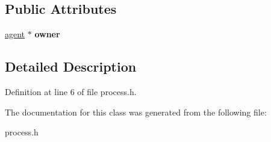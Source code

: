 \subsection*{Public Attributes}
\begin{DoxyCompactItemize}
\item 
\mbox{\label{classprocess_a6f930d4d4d03ac802ac349ef7373a9c5}} 
\mbox{\hyperlink{classagent}{agent}} $\ast$ {\bfseries owner}
\end{DoxyCompactItemize}


\subsection{Detailed Description}


Definition at line 6 of file process.\+h.



The documentation for this class was generated from the following file\+:\begin{DoxyCompactItemize}
\item 
process.\+h\end{DoxyCompactItemize}
